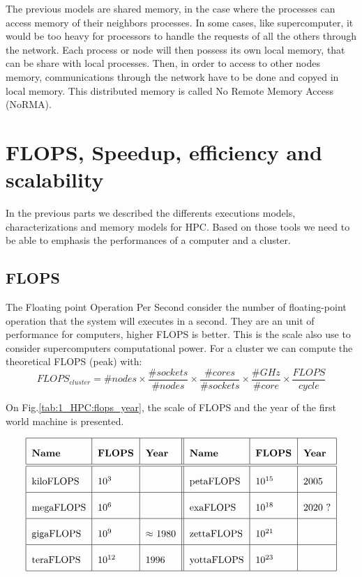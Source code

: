 The previous models are shared memory, in the case where the processes can access memory of their neighbors processes. 
In some cases, like supercomputer, it would be too heavy for processors to handle the requests of all the others through the network. 
Each process or node will then possess its own local memory, that can be share with local processes. 
Then, in order to access to other nodes memory, communications through the network have to be done and copyed in local memory. 
This distributed memory is called No Remote Memory Access (NoRMA).

\section{FLOPS, Speedup, efficiency and scalability}
In the previous parts we described the differents executions models, characterizations and memory models for HPC. 
Based on those tools we need to be able to emphasis the performances of a computer and a cluster. 

\subsection{FLOPS}
The Floating point Operation Per Second consider the number of floating-point operation that the system will executes in a second. 
They are an unit of performance for computers, higher FLOPS is better. 
This is the scale also use to consider supercomputers computational power. 
For a cluster we can compute the theoretical FLOPS (peak) with:
\begin{equation}
FLOPS_{cluster} = \#nodes \times \frac{\#sockets}{\#nodes} \times \frac{\#cores}{\#sockets} \times \frac{\#GHz}{\#core} \times \frac{FLOPS}{cycle}
\end{equation}

On Fig.\ref{tab:1_HPC:flops_year}, the scale of FLOPS and the year of the first world machine is presented. 

\begin{table}
\[\arraycolsep=1.4pt\def\arraystretch{2.2}
\begin{tabular}{| l | l | l || l | l | l |}
\hline
	\textbf{Name} & \textbf{FLOPS} & \textbf{Year} & \textbf{Name} & \textbf{FLOPS} & \textbf{Year} \\
	\hline
	\hline
	kiloFLOPS & $10^{3}$ & & petaFLOPS  & $10^{15}$ & 2005 \\ 
	\hline
	megaFLOPS & $10^{6}$ & & exaFLOPS   & $10^{18}$ & 2020 ? \\
	\hline
	gigaFLOPS & $10^{9}$ & $\approx$ 1980  & zettaFLOPS & $10^{21}$ & \\
	\hline
	teraFLOPS & $10^{12}$ & 1996 & yottaFLOPS & $10^{23}$ & \\
	\hline
	\end{tabular}
	\]
	\caption{Floating-point Operation per Second and years in HPC.}
	\label{tab:1_HPC:flops_year}
	\end{table}

